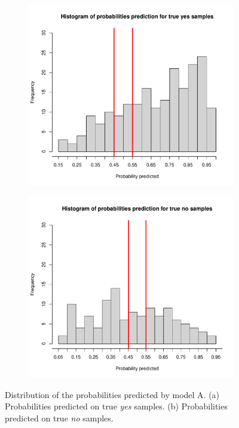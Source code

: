 \begin{figure}[h]
	\begin{subfigure}{.5\textwidth}
		\centering
		\includegraphics[width=0.7\linewidth]{ImageFiles/Classification/LogReg/probability_pred_all_yes}
		\caption{}
		\label{fig:ProbPredYesA}
	\end{subfigure}
	\begin{subfigure}{.5\textwidth}
		\centering
		\includegraphics[width=0.7\linewidth]{ImageFiles/Classification/LogReg/probability_pred_all_no}
		\caption{}
		\label{fig:ProbPredNoA}
	\end{subfigure}
	\caption{Distribution of the probabilities predicted by model A. (a) Probabilities predicted on true \textit{yes} samples. (b) Probabilities predicted on true \textit{no} samples.}
	\label{fig:ProbPredA}
\end{figure}


